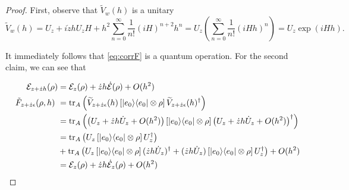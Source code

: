 \documentclass{article}
\newcommand{\e}{\epsilon}
\newcommand{\til}{\widetilde}
\newcommand\ketbra[2]{\ket{#1}\!\bra{#2}}
\begin{document}
\begin{proof}
First, observe that $\til{V}_w(h)$ is a unitary
\begin{equation}
\til{V}_w(h) = U_z + i \dot{z} h U_z H + h^2 \sum_{n=0}^\infty \frac{1}{n!} (iH)^{n+2}h^n = U_z(\sum_{n=0}^\infty \frac{1}{n!} (iHh)^{n}) = U_z \exp(iHh).
\end{equation}

It immediately follows that \ref{eq:corrF} is a quantum operation. For the second claim, we can see that

\begin{equation}
\begin{split}
\end{split}
\begin{align*}
\mathcal{E}_{z+\dot{z}h}(\rho)
&= \mathcal{E}_z(\rho) + \dot{z} h \dot{\mathcal{E}}(\rho) + O(h^2) \\
~
~
\tilde{F}_{z+\dot{z}\e}(\rho, h)
~
&= \operatorname{tr}_A\left(\til{V}_{z+\dot{z}\e}(h) \left[ \ketbra{e_0}{e_0} \otimes \rho \right] \til{V}_{z+\dot{z}\e}(h)^\dagger\right) \\
~
&= \operatorname{tr}_A\left(\left( U_z + \dot{z} h \dot{U}_z + O(h^2) \right)
\left[ \ketbra{e_0}{e_0} \otimes \rho \right]
\left( U_z + \dot{z} h \dot{U}_z + O(h^2) \right)^\dagger\right)\\
~
&=\operatorname{tr}_A\left(U_z \left[ \ketbra{e_0}{e_0} \otimes \rho \right] U_z^\dagger\right) \\
&+ \operatorname{tr}_A\left(U_z \left[ \ketbra{e_0}{e_0} \otimes \rho \right] (\dot{z} h \dot{U}_z)^\dagger
+ (\dot{z} h \dot{U}_z) \left[ \ketbra{e_0}{e_0} \otimes \rho \right] U_z^\dagger \right) + O(h^2)\\
~
&= \mathcal{E}_z(\rho) + \dot{z} h \dot{\mathcal{E}}_z(\rho) + O(h^2)
\end{align*}
\end{equation}
\end{proof}
\end{document}

